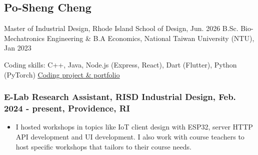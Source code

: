 \documentclass[12pt]{article}
\begin{document}
\begin{multicols}{2}
    \section*{Po-Sheng Cheng}
    
    
    \columnbreak
    {\sffamily \noindent
    Master of Industrial Design, Rhode Island School of Design, Jun. 2026 \newline
    B.Sc. Bio-Mechatronics Engineering \& \newline B.A Economics, National Taiwan University (NTU), Jan 2023
    }
\end{multicols}
\noindent Coding skills: {\sffamily C++, Java, Node.js (Express, React), Dart (Flutter), Python (PyTorch)}
\newline \href{https://bencer3283.github.io/art/}{\underline{Coding project \& portfolio}}
    \subsubsection*{E-Lab Research Assistant, RISD Industrial Design, Feb. 2024 - present, Providence, RI}
        {\sffamily
        \begin{itemize}
            \item I hosted workshops in topics like IoT client design with ESP32, server HTTP API development and UI development.
            I also work with course teachers to host specific workshops that tailors to their course needs.
        \end{itemize}
        }
\end{document}
